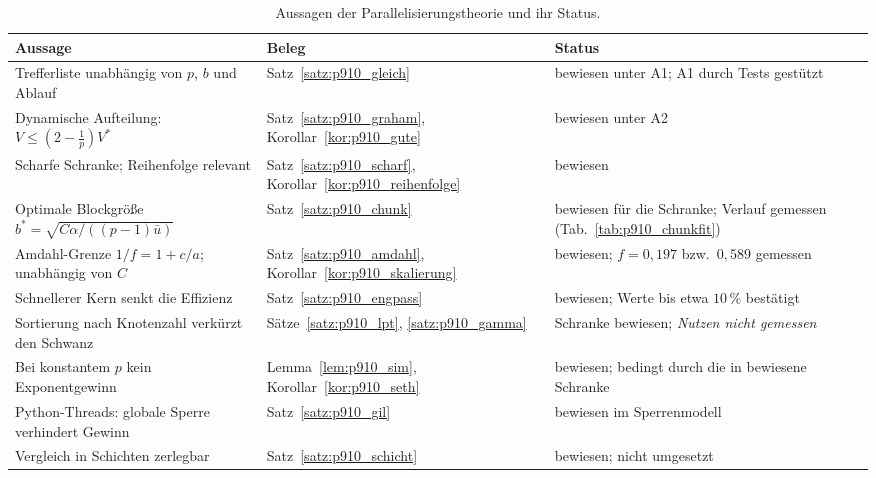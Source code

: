 \documentclass[a4paper,12pt, twoside]{report}
\theoremstyle{definition}
\begin{document}
\begin{table}[!htbp]
\centering
\small
\caption{Aussagen der Parallelisierungstheorie und ihr Status.}
\label{tab:p910_status}
\begin{tabular}{@{}>{\raggedright\arraybackslash}p{6.2cm}>{\raggedright\arraybackslash}p{3.2cm}>{\raggedright\arraybackslash}p{4.4cm}@{}}
\toprule
Aussage & Beleg & Status \\
\midrule
Trefferliste unabhängig von $p$, $b$ und Ablauf & Satz~\ref{satz:p910_gleich} & bewiesen unter A1; A1 durch Tests gestützt \\
Dynamische Aufteilung: $V\le(2-\frac1p)V^\ast$ & Satz~\ref{satz:p910_graham}, Korollar~\ref{kor:p910_gute} & bewiesen unter A2 \\
Scharfe Schranke; Reihenfolge relevant & Satz~\ref{satz:p910_scharf}, Korollar~\ref{kor:p910_reihenfolge} & bewiesen \\
Optimale Blockgröße $b^\ast=\sqrt{C\alpha/((p-1)\bar u)}$ & Satz~\ref{satz:p910_chunk} & bewiesen für die Schranke; Verlauf gemessen (Tab.~\ref{tab:p910_chunkfit}) \\
Amdahl-Grenze $1/f=1+c/a$; unabhängig von $C$ & Satz~\ref{satz:p910_amdahl}, Korollar~\ref{kor:p910_skalierung} & bewiesen; $f=0{,}197$ bzw.\ $0{,}589$ gemessen \\
Schnellerer Kern senkt die Effizienz & Satz~\ref{satz:p910_engpass} & bewiesen; Werte bis etwa $10\,\%$ bestätigt \\
Sortierung nach Knotenzahl verkürzt den Schwanz & Sätze~\ref{satz:p910_lpt}, \ref{satz:p910_gamma} & Schranke bewiesen; \emph{Nutzen nicht gemessen} \\
Bei konstantem $p$ kein Exponentgewinn & Lemma~\ref{lem:p910_sim}, Korollar~\ref{kor:p910_seth} & bewiesen; bedingt durch die in \cite{epp2026subgraph} bewiesene Schranke \\
Python-Threads: globale Sperre verhindert Gewinn & Satz~\ref{satz:p910_gil} & bewiesen im Sperrenmodell \\
Vergleich in Schichten zerlegbar & Satz~\ref{satz:p910_schicht} & bewiesen; nicht umgesetzt \\
\bottomrule
\end{tabular}
\end{table}
\end{document}
